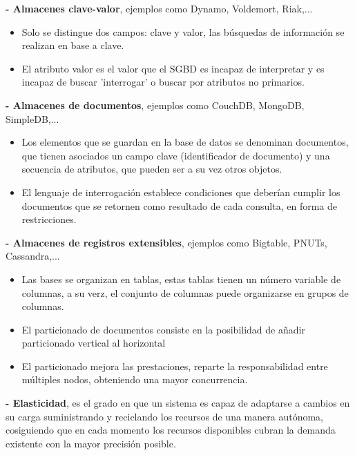 \documentclass[12pt]{amsart}
\begin{document}
    \textbf{- Almacenes clave-valor}, ejemplos como Dynamo, Voldemort, Riak,...
    \begin{itemize}
        \item Solo se distingue dos campos: clave y valor, las búsquedas de información se realizan en base a clave.
        \item El atributo valor es el valor que el SGBD es incapaz de interpretar y es incapaz de buscar 'interrogar' o buscar por atributos no primarios.
    \end{itemize}
     \textbf{- Almacenes de documentos}, ejemplos como CouchDB, MongoDB, SimpleDB,...
     \begin{itemize}
         \item Los elementos que se guardan en la base de datos se denominan documentos, que tienen asociados un campo clave (identificador de documento) y una secuencia de atributos, que pueden ser a su vez otros objetos.
         
         \item El lenguaje de interrogación establece condiciones que deberían cumplir los documentos que se retornen como resultado de cada consulta, en forma de restricciones.
     \end{itemize}
     
    \textbf{- Almacenes de registros extensibles}, ejemplos como Bigtable, PNUTs, Cassandra,...
    
    \begin{itemize}
        \item Las bases se organizan en tablas, estas tablas tienen un número variable de columnas, a su verz, el conjunto de columnas puede organizarse en grupos de columnas.
        
        \item El particionado de documentos consiste en la posibilidad de añadir particionado vertical al horizontal
        
        \item El particionado mejora las prestaciones, reparte la responsabilidad entre múltiples nodos, obteniendo una mayor concurrencia.
    \end{itemize}
    
    \pagebreak
    
    \textbf{- Elasticidad}, es el grado en que un sistema es capaz de adaptarse a cambios en su carga suministrando y reciclando los recursos de una manera autónoma, cosiguiendo que en cada momento los recursos disponibles cubran la demanda existente con la mayor precisión posible.
    
\end{document}
